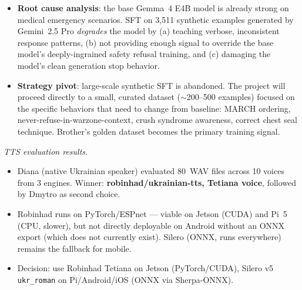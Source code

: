 \documentclass{article}
\theoremstyle{plain}
\theoremstyle{definition}
\theoremstyle{remark}
\begin{document}
\begin{itemize}
\item \textbf{Root cause analysis}: the base Gemma~4 E4B model is already strong on medical emergency scenarios. SFT on 3{,}511 synthetic examples generated by Gemini~2.5 Pro \emph{degrades} the model by (a) teaching verbose, inconsistent response patterns, (b) not providing enough signal to override the base model's deeply-ingrained safety refusal training, and (c) damaging the model's clean generation stop behavior.
\item \textbf{Strategy pivot}: large-scale synthetic SFT is abandoned. The project will proceed directly to a small, curated dataset ($\sim$200--500 examples) focused on the specific behaviors that need to change from baseline: MARCH ordering, never-refuse-in-warzone-context, crush syndrome awareness, correct chest seal technique. Brother's golden dataset becomes the primary training signal.
\end{itemize}

\textit{TTS evaluation results.}
\begin{itemize}
\item Diana (native Ukrainian speaker) evaluated 80~WAV files across 10 voices from 3 engines. Winner: \textbf{robinhad/ukrainian-tts, Tetiana voice}, followed by Dmytro as second choice.
\item Robinhad runs on PyTorch/ESPnet --- viable on Jetson (CUDA) and Pi~5 (CPU, slower), but not directly deployable on Android without an ONNX export (which does not currently exist). Silero (ONNX, runs everywhere) remains the fallback for mobile.
\item Decision: use Robinhad Tetiana on Jetson (PyTorch/CUDA), Silero v5 \texttt{ukr\_roman} on Pi/Android/iOS (ONNX via Sherpa-ONNX).
\end{itemize}
\end{document}
